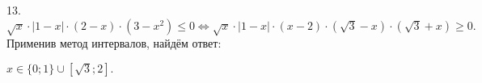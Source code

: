 13. $\sqrt{x}\cdot|1-x|\cdot(2-x)\cdot(3-x^2)\leqslant0 \Leftrightarrow \sqrt{x}\cdot|1-x|\cdot(x-2)\cdot(\sqrt{3}-x)\cdot(\sqrt{3}+x)\geqslant0.$
Применив метод интервалов, найдём ответ:
\begin{figure}[ht!]
\end{figure}
$x\in\{0; 1\}\cup[\sqrt{3};2].$\\

